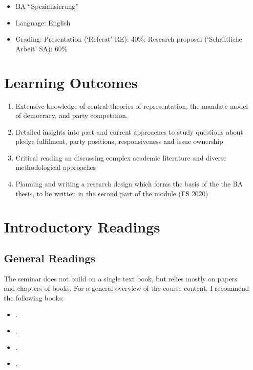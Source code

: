 \documentclass[abstract=on,parskip=full,headings=standardclasses,fontsize=11pt,paper=a4]{scrartcl}
\begin{document}
\begin{itemize}
\item BA ``Spezialisierung''
\item  Language: English
\item Grading: Presentation (`Referat' RE): 40\%;  Research proposal (`Schriftliche Arbeit' SA): 60\%
\end{itemize}

\section*{Learning Outcomes}

\begin{enumerate}
\item Extensive knowledge of central theories of representation, the mandate model of democracy, and party competition. 
\item Detailed insights into past and current approaches to study questions about pledge fulfilment, party positions, responsiveness and issue ownership 
\item Critical reading an discussing  complex academic literature and diverse methodological approaches
\item Planning and writing a research design which forms the basis of the the BA thesis, to be written in the second part of the module (FS 2020)
\end{enumerate}

\section*{Introductory Readings}

\subsection*{General Readings}

The seminar does not build on a single text book, but relies mostly on papers and chapters of books. For  a general overview of the course content, I recommend the following books:

\begin{itemize}
\item {}.
\item {}.
\item {}.
\item {}.
\end{itemize}
\end{document}
